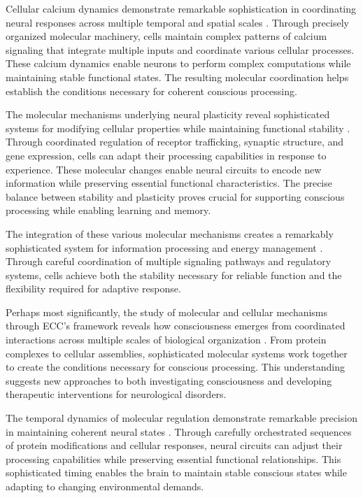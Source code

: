 Cellular calcium dynamics demonstrate remarkable sophistication in coordinating neural responses across multiple temporal and spatial scales \cite{Reese2016}. Through precisely organized molecular machinery, cells maintain complex patterns of calcium signaling that integrate multiple inputs and coordinate various cellular processes. These calcium dynamics enable neurons to perform complex computations while maintaining stable functional states. The resulting molecular coordination helps establish the conditions necessary for coherent conscious processing.

The molecular mechanisms underlying neural plasticity reveal sophisticated systems for modifying cellular properties while maintaining functional stability \cite{Takeuchi2014}. Through coordinated regulation of receptor trafficking, synaptic structure, and gene expression, cells can adapt their processing capabilities in response to experience. These molecular changes enable neural circuits to encode new information while preserving essential functional characteristics. The precise balance between stability and plasticity proves crucial for supporting conscious processing while enabling learning and memory.

The integration of these various molecular mechanisms creates a remarkably sophisticated system for information processing and energy management \cite{Wang2020}. Through careful coordination of multiple signaling pathways and regulatory systems, cells achieve both the stability necessary for reliable function and the flexibility required for adaptive response.

Perhaps most significantly, the study of molecular and cellular mechanisms through ECC's framework reveals how consciousness emerges from coordinated interactions across multiple scales of biological organization \cite{Sudhof2018}. From protein complexes to cellular assemblies, sophisticated molecular systems work together to create the conditions necessary for conscious processing. This understanding suggests new approaches to both investigating consciousness and developing therapeutic interventions for neurological disorders.

The temporal dynamics of molecular regulation demonstrate remarkable precision in maintaining coherent neural states \cite{Namburi2016}. Through carefully orchestrated sequences of protein modifications and cellular responses, neural circuits can adjust their processing capabilities while preserving essential functional relationships. This sophisticated timing enables the brain to maintain stable conscious states while adapting to changing environmental demands.

